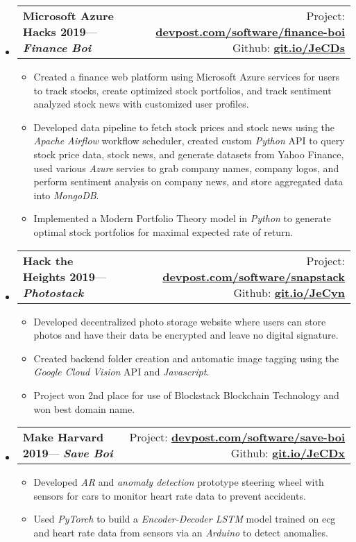 \documentclass[letterpaper, 8pt]{extarticle}
\makeatletter
\newcommand{\resitem}[1]{\item #1 \vspace{-2pt}}
\newcommand{\smallressubheading}[4]{
\begin{tabular*}{7.40in}{l@{\extracolsep{\fill}}r}
    \textbf{#1}\space\space --- \textit{\textbf{#2}}& #3 \\
\end{tabular*}\vspace{-6pt}}
\newcommand{\genlink}[1]{\href{https://www.#1}{\textbf{#1}}} %
\makeatother
\begin{document}
\begin{itemize}
\setlength{\leftmargini}{0.5em}

\item
    \smallressubheading{Microsoft Azure Hacks 2019}{Finance Boi}{Project: \genlink{devpost.com/software/finance-boi} \space Github: \genlink{git.io/JeCDs}}\\
    \begin{itemize}
        \resitem{Created a finance web platform using Microsoft Azure services for users to track stocks, create optimized stock portfolios, and track sentiment analyzed stock news with customized user profiles.}
        \resitem{Developed data pipeline to fetch stock prices and stock news using the \emph{Apache Airflow} workflow scheduler, created custom \emph{Python} API to query stock price data, stock news, and generate datasets from Yahoo Finance, used various \emph{Azure} servies to grab company names, company logos, and perform sentiment analysis on company news, and store aggregated data into \emph{MongoDB}.}
        \resitem{Implemented a Modern Portfolio Theory model in \emph{Python} to generate optimal stock portfolios for maximal expected rate of return.}
    \end{itemize}

\item
    \smallressubheading{Hack the Heights 2019}{Photostack}{Project: \genlink{devpost.com/software/snapstack} \space Github: \genlink{git.io/JeCyn}}\\
    \begin{itemize}
        \resitem{Developed decentralized photo storage website where users can store photos and have their data be encrypted and leave no digital signature.}
        \resitem{Created backend folder creation and automatic image tagging using the \emph{Google Cloud Vision} API and \emph{Javascript}.}
        \resitem{Project won 2nd place for use of Blockstack Blockchain Technology and won best domain name.}
    \end{itemize}

\item
    \smallressubheading{Make Harvard 2019}{Save Boi}{Project: \genlink{devpost.com/software/save-boi} \space Github: \genlink{git.io/JeCDx}}\\
    \begin{itemize}
        \resitem{Developed \emph{AR} and \emph{anomaly detection} prototype steering wheel with sensors for cars to monitor heart rate data to prevent accidents.}
        \resitem{Used \emph{PyTorch} to build a \emph{Encoder-Decoder LSTM} model trained on ecg and heart rate data from sensors via an \emph{Arduino} to detect anomalies.}
    \end{itemize}


\end{itemize}
\end{document}
